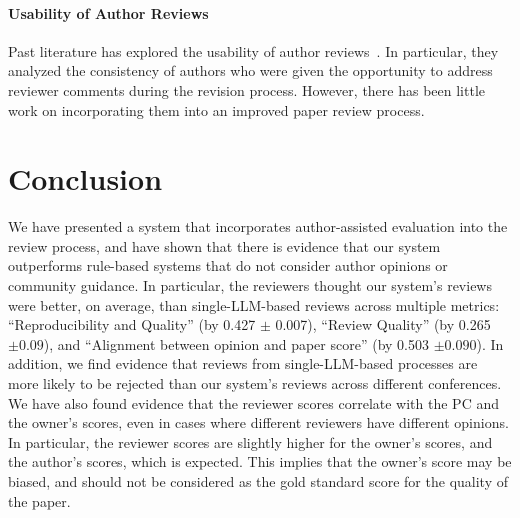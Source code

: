 \documentclass{article} %
\begin{document}
\paragraph{Usability of Author Reviews} 
Past literature has explored the usability of author reviews~\citep{beygelzimer2023has,cortes2021inconsistency}. In particular, they analyzed the consistency of authors who were given the opportunity to address reviewer comments during the revision process. However, there has been little work on incorporating them into an improved paper review process. 



\section{Conclusion}

\label{sec:conclusion}
We have presented a system that incorporates author-assisted evaluation into the review process, and have shown that there is evidence that our system outperforms rule-based systems that do not consider author opinions or community guidance. In particular, the reviewers thought our system's reviews were better, on average, than single-LLM-based reviews across multiple metrics: ``Reproducibility and Quality'' (by 0.427 $\pm$ 0.007), ``Review Quality'' (by 0.265 $\pm 0.09$), and ``Alignment between opinion and paper score'' (by 0.503 $\pm 0.090$). In addition, we find evidence that reviews from single-LLM-based processes are more likely to be rejected than our system's reviews across different conferences. We have also found evidence that the reviewer scores correlate with the PC and the owner's scores, even in cases where different reviewers have different opinions. In particular, the reviewer scores are slightly higher for the owner's scores, and the author's scores, which is expected. This implies that the owner's score may be biased, and should not be considered as the gold standard score for the quality of the paper. 


\end{document}
